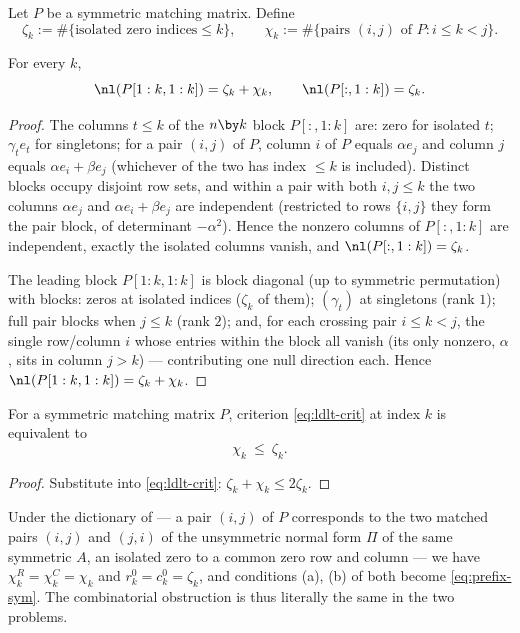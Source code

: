 Let $P$ be a symmetric matching matrix.  Define
\[
  \zeta_k := \#\{\text{isolated zero indices} \le k\},
  \qquad
  \chi_k := \#\{\text{pairs } (i,j) \text{ of } P : i \le k < j\} .
\]

\begin{lemma}\label{lem:null-sym-matching}
  For every $k$,
  \[
    \nl(P[1:k,1:k]) = \zeta_k + \chi_k,
    \qquad
    \nl(P[:,1:k]) = \zeta_k .
  \]
\end{lemma}

\begin{proof}
  The columns $t \le k$ of the $n \by k$ block $P[:,1:k]$ are: zero for
  isolated $t$; $\gamma_t e_t$ for singletons; for a pair $(i,j)$ of $P$,
  column $i$ of $P$ equals $\alpha e_j$ and column $j$ equals
  $\alpha e_i + \beta e_j$ (whichever of the two has index $\le k$ is
  included).  Distinct blocks occupy disjoint row sets, and within a pair
  with both $i, j \le k$ the two columns $\alpha e_j$ and
  $\alpha e_i + \beta e_j$ are independent (restricted to rows $\{i,j\}$
  they form the pair block, of determinant $-\alpha^2$).  Hence the nonzero
  columns of $P[:,1:k]$ are independent, exactly the isolated columns
  vanish, and $\nl(P[:,1:k]) = \zeta_k$.

  The leading block $P[1:k,1:k]$ is block diagonal (up to symmetric
  permutation) with blocks: zeros at isolated indices ($\zeta_k$ of them);
  $(\gamma_t)$ at singletons (rank $1$); full pair blocks when
  $j \le k$ (rank $2$); and, for each crossing pair $i \le k < j$, the
  single row/column $i$ whose entries within the block all vanish
  (its only nonzero, $\alpha$, sits in column $j > k$) --- contributing one
  null direction each.  Hence
  $\nl(P[1:k,1:k]) = \zeta_k + \chi_k$.
\end{proof}

\begin{lemma}\label{lem:comb-sym}
  For a symmetric matching matrix $P$, criterion \cref{eq:ldlt-crit} at
  index $k$ is equivalent to
  \begin{equation}\label{eq:prefix-sym}
    \chi_k \ \le\ \zeta_k .
  \end{equation}
\end{lemma}

\begin{proof}
  Substitute  into \cref{eq:ldlt-crit}:
  $\zeta_k + \chi_k \le 2 \zeta_k$.
\end{proof}

\begin{remark}\label{rem:comb-dictionary}
  Under the dictionary of  --- a pair $(i,j)$ of
  $P$ corresponds to the two matched pairs $(i,j)$ and $(j,i)$ of the
  unsymmetric normal form $\Pi$ of the same symmetric $A$, an isolated zero
  to a common zero row and column --- we have
  $\chi^R_k = \chi^C_k = \chi_k$ and $r^0_k = c^0_k = \zeta_k$, and
  conditions (a), (b) of  both become
  \cref{eq:prefix-sym}.  The combinatorial obstruction is thus literally
  the same in the two problems.
\end{remark}
